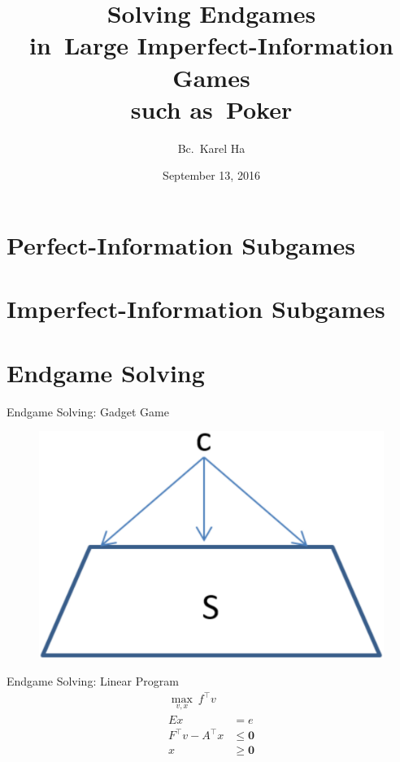 \documentclass{beamer}
\title{Solving Endgames \\in~Large Imperfect-Information Games \\such as~Poker}
\date{September 13, 2016}
\author{Bc.~Karel Ha}
\institute{Department of~Applied Mathematics \\Charles University}
\newcommand{\vect}[1]{\boldsymbol{#1}}
\begin{document}
  \maketitle


  \section{Perfect-Information Subgames}

  \section{Imperfect-Information Subgames}

  \section{Endgame Solving}
  \begin{frame}{Endgame Solving: Gadget Game}
    \begin{figure}
      \centering
      \includegraphics[width=.5\textwidth]{../img/endgame-solving-gadget.png}
    \end{figure}
  \end{frame}

  \begin{frame}{Endgame Solving: Linear Program}
    \begin{equation*}
      \label{lp:endgame-solving}
      \begin{split}
        \max_{v, x}\  f^\top v & \\
        Ex &= e \\
        F^\top v - A^\top x &\le \vect{0} \\
        x &\ge \vect{0}
      \end{split}
    \end{equation*}
  \end{frame}
\end{document}
